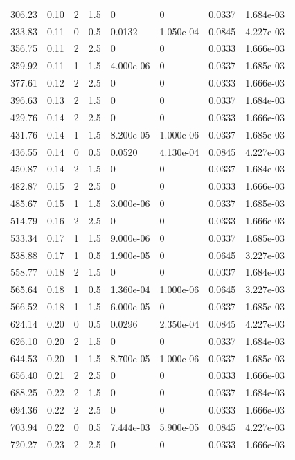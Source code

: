 \documentclass[preview]{standalone}
\begin{document}
{{\begin{tabular}{L{1.2cm}C{1.2cm} C{0.3cm}C{0.5cm} C{1.4cm}C{1.4cm} C{1.4cm}C{1.4cm}}
  306.23  &  0.10  & 2     & 1.5 &  0  & 0  & 0.0337 &  1.684e-03   \\ 
  333.83  &  0.11  & 0     & 0.5 &  0.0132  & 1.050e-04  & 0.0845 &  4.227e-03   \\ 
  356.75  &  0.11  & 2     & 2.5 &  0  & 0  & 0.0333 &  1.666e-03   \\ 
  359.92  &  0.11  & 1     & 1.5 &  4.000e-06  & 0  & 0.0337 &  1.685e-03   \\ 
  377.61  &  0.12  & 2     & 2.5 &  0  & 0  & 0.0333 &  1.666e-03   \\ 
  396.63  &  0.13  & 2     & 1.5 &  0  & 0  & 0.0337 &  1.684e-03   \\ 
  429.76  &  0.14  & 2     & 2.5 &  0  & 0  & 0.0333 &  1.666e-03   \\ 
  431.76  &  0.14  & 1     & 1.5 &  8.200e-05  & 1.000e-06  & 0.0337 &  1.685e-03   \\ 
  436.55  &  0.14  & 0     & 0.5 &  0.0520  & 4.130e-04  & 0.0845 &  4.227e-03   \\ 
  450.87  &  0.14  & 2     & 1.5 &  0  & 0  & 0.0337 &  1.684e-03   \\ 
  482.87  &  0.15  & 2     & 2.5 &  0  & 0  & 0.0333 &  1.666e-03   \\ 
  485.67  &  0.15  & 1     & 1.5 &  3.000e-06  & 0  & 0.0337 &  1.685e-03   \\ 
  514.79  &  0.16  & 2     & 2.5 &  0  & 0  & 0.0333 &  1.666e-03   \\ 
  533.34  &  0.17  & 1     & 1.5 &  9.000e-06  & 0  & 0.0337 &  1.685e-03   \\ 
  538.88  &  0.17  & 1     & 0.5 &  1.900e-05  & 0  & 0.0645 &  3.227e-03   \\ 
  558.77  &  0.18  & 2     & 1.5 &  0  & 0  & 0.0337 &  1.684e-03   \\ 
  565.64  &  0.18  & 1     & 0.5 &  1.360e-04  & 1.000e-06  & 0.0645 &  3.227e-03   \\ 
  566.52  &  0.18  & 1     & 1.5 &  6.000e-05  & 0  & 0.0337 &  1.685e-03   \\ 
  624.14  &  0.20  & 0     & 0.5 &  0.0296  & 2.350e-04  & 0.0845 &  4.227e-03   \\ 
  626.10  &  0.20  & 2     & 1.5 &  0  & 0  & 0.0337 &  1.684e-03   \\ 
  644.53  &  0.20  & 1     & 1.5 &  8.700e-05  & 1.000e-06  & 0.0337 &  1.685e-03   \\ 
  656.40  &  0.21  & 2     & 2.5 &  0  & 0  & 0.0333 &  1.666e-03   \\ 
  688.25  &  0.22  & 2     & 1.5 &  0  & 0  & 0.0337 &  1.684e-03   \\ 
  694.36  &  0.22  & 2     & 2.5 &  0  & 0  & 0.0333 &  1.666e-03   \\ 
  703.94  &  0.22  & 0     & 0.5 &  7.444e-03  & 5.900e-05  & 0.0845 &  4.227e-03   \\ 
  720.27  &  0.23  & 2     & 2.5 &  0  & 0  & 0.0333 &  1.666e-03   \\ 
\hline 
\end{tabular} 

}}
\end{document}

